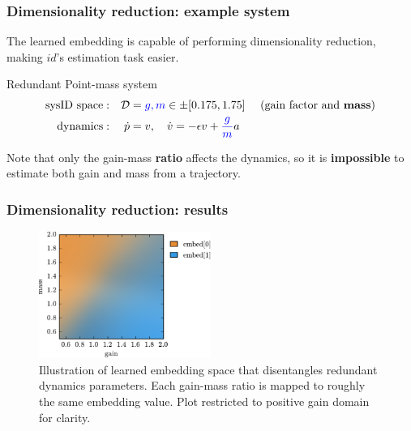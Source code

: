 \documentclass{beamer}
\newcommand{\cD}{\mathcal{D}}
\newcommand{\idfn}{{id}}
\newcommand{\good}[1]{\textcolor{blue}{#1}}
\begin{document}
\begin{frame}
\frametitle{Dimensionality reduction: example system}
The learned embedding is capable of performing dimensionality reduction,
making $\idfn$'s estimation task easier.

\begin{block}{Redundant Point-mass system}
\vspace{-.4cm}
\begin{align*}
\text{sysID space}  & : & \cD    &= \good{g, m} \in \pm[0.175, 1.75] &
\text{ (gain factor and \textbf{mass})} \\
\text{dynamics}     & : & \dot p &= v, \quad \dot v = -\epsilon v + \good{\frac{g}{m}} a &
\end{align*}
\end{block}

Note that only the gain-mass \textbf{ratio} affects the dynamics, so it is \textbf{impossible} to estimate both gain and mass from a trajectory.
\end{frame}

\begin{frame}
\frametitle{Dimensionality reduction: results}
\begin{figure}
\centering
\includegraphics[width=0.5\textwidth]{embed_colors.pdf}
\caption{
Illustration of learned embedding space that disentangles redundant dynamics parameters.
Each gain-mass ratio is mapped to roughly the same embedding value.
Plot restricted to positive gain domain for clarity.
}
\label{fig:embed_colors}
\end{figure}
\end{frame}
\end{document}
